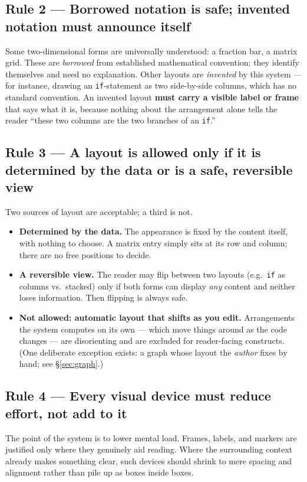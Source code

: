 \documentclass[11pt]{article}
\newcommand{\req}[1]{\textbf{\color{accent}#1}}
\begin{document}
\subsection{Rule 2 --- Borrowed notation is safe; invented notation must announce itself}
Some two-dimensional forms are universally understood: a fraction bar, a matrix grid. These are \emph{borrowed} from established mathematical convention; they identify themselves and need no explanation. Other layouts are \emph{invented} by this system --- for instance, drawing an \texttt{if}-statement as two side-by-side columns, which has no standard convention. An invented layout \req{must carry a visible label or frame} that says what it is, because nothing about the arrangement alone tells the reader ``these two columns are the two branches of an \texttt{if}.''

\subsection{Rule 3 --- A layout is allowed only if it is determined by the data or is a safe, reversible view}
Two sources of layout are acceptable; a third is not.
\begin{itemize}[leftmargin=1.4em,itemsep=3pt]
  \item \textbf{Determined by the data.} The appearance is fixed by the content itself, with nothing to choose. A matrix entry simply sits at its row and column; there are no free positions to decide.
  \item \textbf{A reversible view.} The reader may flip between two layouts (e.g.\ \texttt{if} as columns vs.\ stacked) only if both forms can display \emph{any} content and neither loses information. Then flipping is always safe.
  \item \textbf{Not allowed: automatic layout that shifts as you edit.} Arrangements the system computes on its own --- which move things around as the code changes --- are disorienting and are excluded for reader-facing constructs. (One deliberate exception exists: a graph whose layout the \emph{author} fixes by hand; see \S\ref{sec:graph}.)
\end{itemize}

\subsection{Rule 4 --- Every visual device must reduce effort, not add to it}
The point of the system is to lower mental load. Frames, labels, and markers are justified only where they genuinely aid reading. Where the surrounding context already makes something clear, such devices should shrink to mere spacing and alignment rather than pile up as boxes inside boxes.
\end{document}
